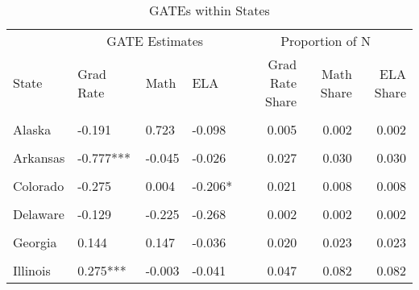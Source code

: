 \begin{table}[!h]
\centering
\caption{\label{tab:state_gates_combined}GATEs within States}
\centering
\begin{tabular}[t]{llllrrr}
\toprule
\multicolumn{1}{c}{ } & \multicolumn{3}{c}{GATE Estimates} & \multicolumn{3}{c}{Proportion of N} \\
\cmidrule(l{3pt}r{3pt}){2-4} \cmidrule(l{3pt}r{3pt}){5-7}
State & Grad Rate & Math & ELA & Grad Rate Share & Math Share & ELA Share\\
\midrule
\cellcolor{gray!10}{Alabama} & \cellcolor{gray!10}{0.209***} & \cellcolor{gray!10}{NA} & \cellcolor{gray!10}{NA} & \cellcolor{gray!10}{0.011} & \cellcolor{gray!10}{NA} & \cellcolor{gray!10}{NA}\\
Alaska & -0.191 & 0.723 & -0.098 & 0.005 & 0.002 & 0.002\\
\cellcolor{gray!10}{Arizona} & \cellcolor{gray!10}{-0.226} & \cellcolor{gray!10}{0.305} & \cellcolor{gray!10}{0.478***} & \cellcolor{gray!10}{0.010} & \cellcolor{gray!10}{0.017} & \cellcolor{gray!10}{0.017}\\
Arkansas & -0.777*** & -0.045 & -0.026 & 0.027 & 0.030 & 0.030\\
\cellcolor{gray!10}{California} & \cellcolor{gray!10}{0.173***} & \cellcolor{gray!10}{-0.06} & \cellcolor{gray!10}{0.037} & \cellcolor{gray!10}{0.040} & \cellcolor{gray!10}{0.069} & \cellcolor{gray!10}{0.069}\\
Colorado & -0.275 & 0.004 & -0.206* & 0.021 & 0.008 & 0.008\\
\cellcolor{gray!10}{Connecticut} & \cellcolor{gray!10}{0.102***} & \cellcolor{gray!10}{0.023} & \cellcolor{gray!10}{-0.057} & \cellcolor{gray!10}{0.013} & \cellcolor{gray!10}{0.017} & \cellcolor{gray!10}{0.017}\\
Delaware & -0.129 & -0.225 & -0.268 & 0.002 & 0.002 & 0.002\\
\cellcolor{gray!10}{Florida} & \cellcolor{gray!10}{0.168**} & \cellcolor{gray!10}{0.203} & \cellcolor{gray!10}{0.099} & \cellcolor{gray!10}{0.008} & \cellcolor{gray!10}{0.007} & \cellcolor{gray!10}{0.007}\\
Georgia & 0.144 & 0.147 & -0.036 & 0.020 & 0.023 & 0.023\\
\cellcolor{gray!10}{Idaho} & \cellcolor{gray!10}{0.21} & \cellcolor{gray!10}{-0.018} & \cellcolor{gray!10}{-0.018} & \cellcolor{gray!10}{0.012} & \cellcolor{gray!10}{0.011} & \cellcolor{gray!10}{0.011}\\
Illinois & 0.275*** & -0.003 & -0.041 & 0.047 & 0.082 & 0.082\\

\end{tabular}
\end{table}
